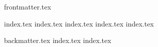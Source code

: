 \documentclass[]{template/lnucsthesis}
\begin{document}
\raggedright
\frontmatter
  {frontmatter.tex}
 
\mainmatter
  {index.tex}
  {index.tex}
  {index.tex}
  {index.tex}
  {index.tex}

\backmatter
  {backmatter.tex}
  {index.tex}
  {index.tex}
\end{document}
